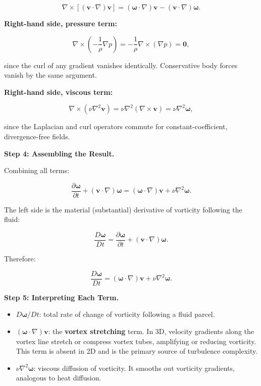 \begin{equation}
\nabla\times\left[(\mathbf{v}\cdot\nabla)\mathbf{v}\right] = (\boldsymbol{\omega}\cdot\nabla)\mathbf{v} - (\mathbf{v}\cdot\nabla)\boldsymbol{\omega}.
\end{equation}

\textbf{Right-hand side, pressure term:}

\begin{equation}
\nabla\times\left(-\frac{1}{\rho}\nabla p\right) = -\frac{1}{\rho}\nabla\times(\nabla p) = \mathbf{0},
\end{equation}

since the curl of any gradient vanishes identically. Conservative body forces vanish by the same argument.

\textbf{Right-hand side, viscous term:}

\begin{equation}
\nabla\times\left(\nu\nabla^2\mathbf{v}\right) = \nu\nabla^2(\nabla\times\mathbf{v}) = \nu\nabla^2\boldsymbol{\omega},
\end{equation}

since the Laplacian and curl operators commute for constant-coefficient, divergence-free fields.

\textbf{Step 4: Assembling the Result.}

Combining all terms:

\begin{equation}
\frac{\partial \boldsymbol{\omega}}{\partial t} + (\mathbf{v}\cdot\nabla)\boldsymbol{\omega} = (\boldsymbol{\omega}\cdot\nabla)\mathbf{v} + \nu\nabla^2\boldsymbol{\omega}.
\end{equation}

The left side is the material (substantial) derivative of vorticity following the fluid:

\begin{equation}
\frac{D\boldsymbol{\omega}}{Dt} = \frac{\partial \boldsymbol{\omega}}{\partial t} + (\mathbf{v}\cdot\nabla)\boldsymbol{\omega}.
\end{equation}

Therefore:

\begin{equation}
\boxed{\frac{D\boldsymbol{\omega}}{Dt} = (\boldsymbol{\omega}\cdot\nabla)\mathbf{v} + \nu\nabla^2\boldsymbol{\omega}.}
\end{equation}

\textbf{Step 5: Interpreting Each Term.}

\begin{itemize}
\item $D\boldsymbol{\omega}/Dt$: total rate of change of vorticity following a fluid parcel.
\item $(\boldsymbol{\omega}\cdot\nabla)\mathbf{v}$: the \textbf{vortex stretching} term. In 3D, velocity gradients along the vortex line stretch or compress vortex tubes, amplifying or reducing vorticity. This term is absent in 2D and is the primary source of turbulence complexity.
\item $\nu\nabla^2\boldsymbol{\omega}$: viscous diffusion of vorticity. It smooths out vorticity gradients, analogous to heat diffusion.
\end{itemize}

